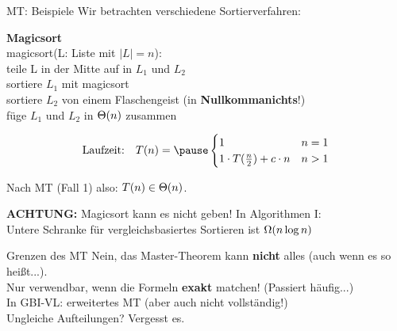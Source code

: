 \begin{frame}[t]{MT: Beispiele}
	Wir betrachten verschiedene Sortierverfahren:\\
	\bigskip
	
	\textbf{Magicsort}\\
	magicsort(L: Liste mit $|L| = n$):\\
	\quad teile L in der Mitte auf in $L_1$ und $L_2$\\
	\quad sortiere $L_1$ mit magicsort\\
	\quad sortiere $L_2$ von einem Flaschengeist (in \textbf{Nullkommanichts}!)\\
	\quad füge $L_1$ und $L_2$ in $\Theta\!\left(n\right)$ zusammen\\
	\medskip
	
	$$\text{Laufzeit:} \quad T(n) = \pause \begin{cases}
	1 & n = 1\\
	1 \cdot T(\fract n/2 ) + c \cdot n & n > 1
	\end{cases}$$
	
	\pause
	Nach MT (Fall 1) also: $T(n) \in \Theta\!\left(n\right)$.
	\medskip
	
	\textbf{ACHTUNG:} Magicsort kann es nicht geben! In Algorithmen I:\\ 
	Untere Schranke für vergleichsbasiertes Sortieren ist $\Omega\!\left(n \log n\right)$
\end{frame}


\begin{frame}{Grenzen des MT}
	Nein, das Master-Theorem kann \textbf{nicht} alles (auch wenn es so heißt...). \\
	\smallskip
	\impl Nur verwendbar, wenn die Formeln \textbf{exakt} matchen! (Passiert häufig...) \\
	\smallskip
	In GBI-VL: erweitertes MT (aber auch nicht vollständig!) \\
	\medskip
	Ungleiche Aufteilungen? Vergesst es. \\
	
	
	
\end{frame}